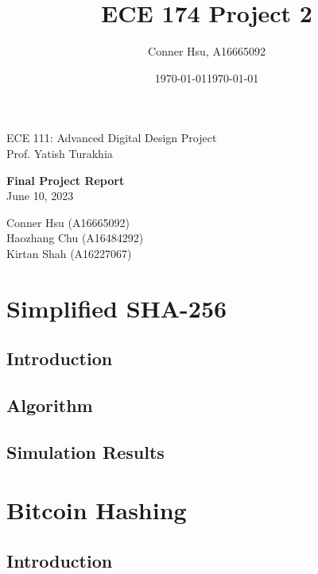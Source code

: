 \documentclass{article}
\title{ECE 174 Project 2}
\author{Conner Hsu, A16665092}
\date{\today}
\begin{document}
\begin{titlepage}
   \begin{center}

       \large ECE 111: Advanced Digital Design Project \\
       Prof. Yatish Turakhia
       \vfill

       \LARGE\textbf{Final Project Report} \\
   \vspace{0.8cm}
       \large June 10, 2023 \\

       \vfill

       Conner Hsu (A16665092) \\
       Haozhang Chu (A16484292) \\
       Kirtan Shah (A16227067)

       \date{\today}

   \end{center}
\end{titlepage}

\tableofcontents

\newpage
\section{Simplified SHA-256}

\subsection{Introduction}


\subsection{Algorithm}


\subsection{Simulation Results}


\newpage
\section{Bitcoin Hashing}

\subsection{Introduction}
\end{document}

